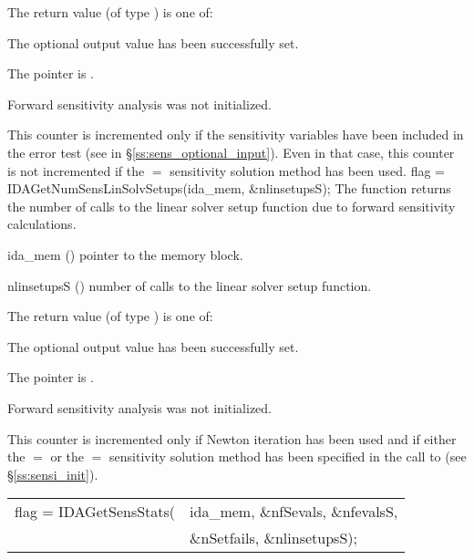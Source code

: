 {
  The return value  (of type ) is one of:
  \begin{args}
  \item[\Id{IDA\_SUCCESS}] 
    The optional output value has been successfully set.
  \item[\Id{IDA\_MEM\_NULL}]
    The  pointer is .
  \item[\Id{IDA\_NO\_SENS}]
    Forward sensitivity analysis was not initialized.
  \end{args}
}
{
  This counter is incremented only if the sensitivity variables have been included
  in the error test (see  in \S\ref{ss:sens_optional_input}). 
  Even in that case, this counter is not incremented if the $=$ 
  sensitivity solution method has been used.
}
{
  flag = IDAGetNumSensLinSolvSetups(ida\_mem, \&nlinsetupsS);
}
{
  The function  returns the number of calls
  to the linear solver setup function due to forward sensitivity calculations.
}
{
  \begin{args}
  \item[ida\_mem] ()
    pointer to the {\idas} memory block.
  \item[nlinsetupsS] ()
    number of calls to the linear solver setup function.
  \end{args}
}
{
  The return value  (of type ) is one of:
  \begin{args}
  \item[\Id{IDA\_SUCCESS}] 
    The optional output value has been successfully set.
  \item[\Id{IDA\_MEM\_NULL}]
    The  pointer is .
  \item[\Id{IDA\_NO\_SENS}]
    Forward sensitivity analysis was not initialized.
  \end{args}
}
{
  This counter is incremented only if Newton iteration has been used and if
  either the $=$ or the $=$ sensitivity
  solution method has been specified in the call to 
  (see \S\ref{ss:sensi_init}).
}
{
  \begin{tabular}[t]{@{}r@{}l@{}}
    flag = IDAGetSensStats(&ida\_mem, \&nfSevals, \&nfevalsS, \\
                             &\&nSetfails, \&nlinsetupsS);
  \end{tabular}
}
